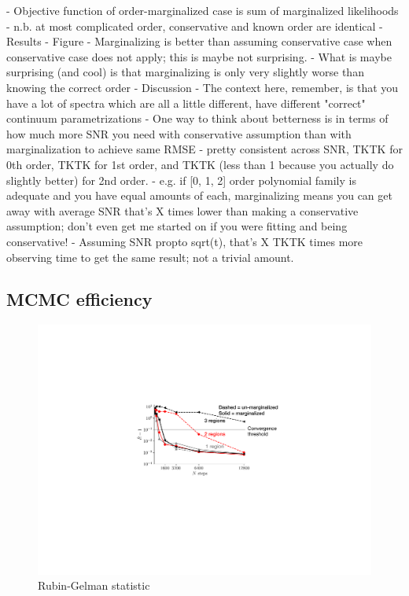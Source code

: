 \documentclass[manuscript]{aastex62}
\begin{document}
    - Objective function of order-marginalized case is sum of marginalized likelihoods
    - n.b. at most complicated order, conservative and known order are identical
- Results
  - Figure
  - Marginalizing is better than assuming conservative case when conservative case does not apply; this is maybe not surprising.
  - What is maybe surprising (and cool) is that marginalizing is only very slightly worse than knowing the correct order
- Discussion
  - The context here, remember, is that you have a lot of spectra which are all a little different, have different "correct" continuum parametrizations
  - One way to think about betterness is in terms of how much more SNR you need with conservative assumption than with marginalization to achieve same RMSE
  - pretty consistent across SNR, TKTK for 0th order, TKTK for 1st order, and TKTK (less than 1 because you actually do slightly better) for 2nd order.
  - e.g. if [0, 1, 2] order polynomial family is adequate and you have equal amounts of each, marginalizing means you can get away with average SNR that's X times lower than making a conservative assumption; don't even get me started on if you were fitting and being conservative!
  - Assuming SNR propto sqrt(t), that's X TKTK times more observing time to get the same result; not a trivial amount.


\subsection{MCMC efficiency}
\label{subsec:multiple-absorption-line-test-case}

\begin{figure}
  \includegraphics{convergence.pdf}
  \caption{Rubin-Gelman statistic}
  \label{fig:convergence-comparison}
\end{figure}
\end{document}
